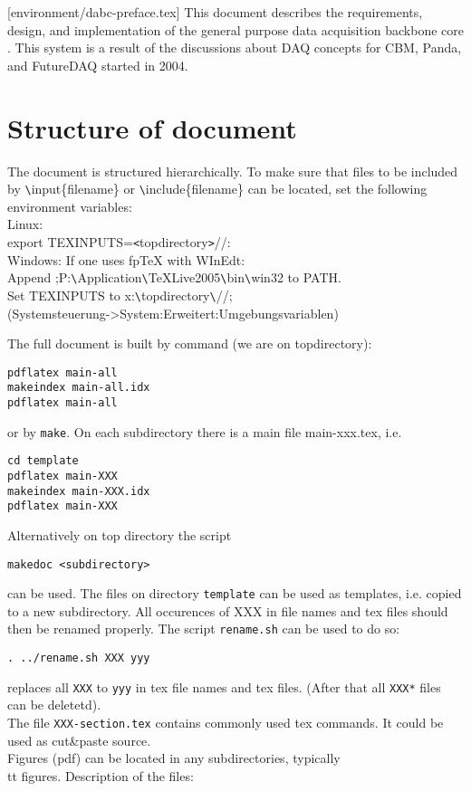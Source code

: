 [environment/dabc-preface.tex]
This document describes the requirements, design, and implementation of the
general purpose data acquisition backbone core \dabc.
This system is a result of the discussions about DAQ concepts for CBM,
Panda, and FutureDAQ started in 2004.

\section{Structure of document}
The document is structured hierarchically. To make sure that files
to be included by \verb+\+input\{filename\} or \verb+\+include\{filename\}
can be located, set the following environment variables:\\
Linux:\\
export TEXINPUTS=\verb+<+topdirectory\verb+>+//:\\
Windows: If one uses fpTeX with WInEdt:\\
Append ;P:\verb+\+Application\verb+\+TeXLive2005\verb+\+bin\verb+\+win32 to PATH.\\
Set TEXINPUTS to x:\verb+\+topdirectory\verb+\+//;\\
(Systemsteuerung->System:Erweitert:Umgebungsvariablen)

The full document is built by command (we are on topdirectory):
\begin{verbatim}
pdflatex main-all
makeindex main-all.idx
pdflatex main-all
\end{verbatim}
or by {\tt make}.
On each subdirectory there is a main file main-xxx.tex, i.e.
\begin{verbatim}
cd template
pdflatex main-XXX
makeindex main-XXX.idx
pdflatex main-XXX
\end{verbatim}
Alternatively on top directory the script 
\begin{verbatim}
makedoc <subdirectory>
\end{verbatim}
can be used.
The files on directory {\tt template} can be used as templates, i.e. copied to a new subdirectory.
All occurences of XXX in file names and tex files should then be renamed properly.
The script {\tt rename.sh} can be used to do so:
\begin{verbatim}
. ../rename.sh XXX yyy
\end{verbatim}
replaces all {\tt XXX} to {\tt yyy} in tex file names and tex files.
(After that all {\tt *XXX*} files can be deletetd).\\
The file {\tt XXX-section.tex} contains commonly used tex commands.
It could be used as cut\&paste source.\\
Figures (pdf) can be located in any subdirectories, typically {\\tt figures}.
Description of the files:
